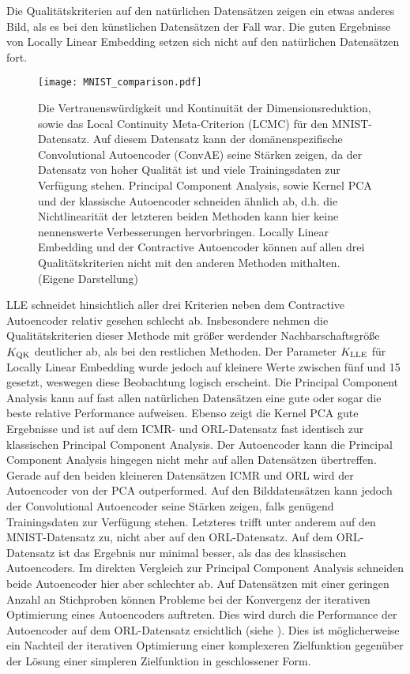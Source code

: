 Die Qualitätskriterien auf den natürlichen Datensätzen zeigen ein etwas anderes Bild, als es bei
den künstlichen Datensätzen der Fall war. Die guten Ergebnisse von Locally Linear Embedding setzen
sich nicht auf den natürlichen Datensätzen fort.
\begin{figure}[ht]
	\begin{center}
		\texttt{[image: MNIST\_comparison.pdf]}
	\end{center}
	\caption[Qualitätskriterien für den MNIST-Datensatz]{Die Vertrauenswürdigkeit und Kontinuität der Dimensionsreduktion, sowie das Local Continuity Meta-Criterion (LCMC) für den MNIST-Datensatz. Auf diesem Datensatz kann der domänenspezifische Convolutional Autoencoder (ConvAE) seine Stärken zeigen, da der Datensatz von hoher Qualität ist und viele Trainingsdaten zur Verfügung stehen. Principal Component Analysis, sowie Kernel PCA und der klassische Autoencoder schneiden ähnlich ab, d.h. die Nichtlinearität der letzteren beiden Methoden kann hier keine nennenswerte Verbesserungen hervorbringen. Locally Linear Embedding und der Contractive Autoencoder können auf allen drei Qualitätskriterien nicht mit den anderen Methoden mithalten. (Eigene Darstellung)}
	\label{fig:MNISTMetrics}
\end{figure}
LLE schneidet hinsichtlich aller drei Kriterien neben dem Contractive Autoencoder relativ gesehen schlecht ab. Insbesondere nehmen die
Qualitätskriterien dieser Methode mit größer werdender Nachbarschaftsgröße $K_{\text{QK}}$ deutlicher ab, als bei den
restlichen Methoden. Der Parameter $K_{\text{LLE}}$ für Locally Linear Embedding wurde jedoch auf kleinere Werte zwischen fünf und 15 gesetzt, weswegen diese Beobachtung logisch erscheint. Die Principal Component Analysis kann auf fast allen natürlichen Datensätzen eine gute oder sogar die
beste relative Performance aufweisen. Ebenso zeigt die Kernel PCA gute Ergebnisse und ist auf dem ICMR- und ORL-Datensatz fast identisch zur klassischen Principal Component Analysis. Der Autoencoder kann die Principal Component Analysis hingegen nicht mehr auf allen Datensätzen übertreffen. Gerade auf den beiden kleineren Datensätzen ICMR und ORL wird der Autoencoder von der PCA outperformed. Auf den Bilddatensätzen kann jedoch der Convolutional
Autoencoder seine Stärken zeigen, falls genügend Trainingsdaten zur Verfügung stehen. Letzteres trifft unter anderem auf den MNIST-Datensatz zu, nicht aber auf den ORL-Datensatz. Auf dem ORL-Datensatz ist das Ergebnis nur minimal besser, als das des klassischen Autoencoders. Im direkten Vergleich zur Principal Component Analysis schneiden beide Autoencoder hier aber schlechter ab.
Auf Datensätzen mit einer geringen Anzahl an Stichproben können Probleme bei der Konvergenz der iterativen Optimierung eines Autoencoders auftreten. Dies wird durch die Performance der Autoencoder auf dem ORL-Datensatz ersichtlich (siehe ). Dies ist möglicherweise ein Nachteil der iterativen Optimierung einer komplexeren Zielfunktion gegenüber der Lösung einer simpleren Zielfunktion in geschlossener Form.

